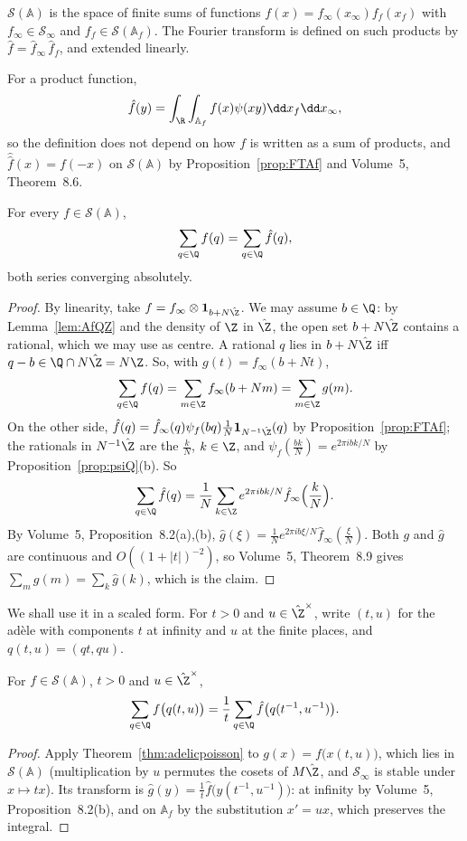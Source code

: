 \begin{definition}
$\mathcal S(\mathbb{A})$ is the space of finite sums of functions $f(x)=f_\infty(x_\infty)f_f(x_f)$ with $f_\infty\in\mathcal S_\infty$ and
$f_f\in\mathcal S(\mathbb{A}_f)$. The Fourier transform is defined on such products by $\hat f=\hat f_\infty\,\hat f_f$, and extended linearly.
\end{definition}

For a product function,
\[
\hat f(y)=\int_\R\int_{\mathbb{A}_f}f(x)\psi(xy)\dd x_f\dd x_\infty,
\]
so the definition does not depend on how $f$ is written as a
sum of products, and $\hat{\hat f}(x)=f(-x)$ on $\mathcal S(\mathbb{A})$ by Proposition~\ref{prop:FTAf} and Volume~5, Theorem~8.6.

\begin{theorem}\label{thm:adelicpoisson}
For every $f\in\mathcal S(\mathbb{A})$,
\[
\sum_{q\in\Q}f(q)=\sum_{q\in\Q}\hat f(q),
\]
both series converging absolutely.
\end{theorem}
\begin{proof}
By linearity, take $f=f_\infty\otimes\mathbf 1_{b+N\hat{\Z}}$. We may assume $b\in\Q$: by Lemma~\ref{lem:AfQZ} and the density of $\Z$ in
$\hat{\Z}$, the open set $b+N\hat{\Z}$ contains a rational, which we may use as centre. A rational $q$ lies in $b+N\hat{\Z}$ iff
$q-b\in\Q\cap N\hat{\Z}=N\Z$. So, with $g(t)=f_\infty(b+Nt)$,
\[
\sum_{q\in\Q}f(q)=\sum_{m\in\Z}f_\infty(b+Nm)=\sum_{m\in\Z}g(m).
\]
On the other side, $\hat f(q)=\hat f_\infty(q)\psi_f(bq)\frac1N\mathbf 1_{N^{-1}\hat{\Z}}(q)$ by Proposition~\ref{prop:FTAf}; the rationals in
$N^{-1}\hat{\Z}$ are the $\frac kN$, $k\in\Z$, and $\psi_f(\frac{bk}N)=e^{2\pi ibk/N}$ by Proposition~\ref{prop:psiQ}(b). So
\[
\sum_{q\in\Q}\hat f(q)=\frac1N\sum_{k\in\Z}e^{2\pi ibk/N}\hat f_\infty\Bigl(\frac kN\Bigr).
\]
By Volume~5, Proposition~8.2(a),(b), $\hat g(\xi)=\frac1Ne^{2\pi ib\xi/N}\hat f_\infty(\frac\xi N)$. Both $g$ and $\hat g$ are continuous
and $O((1+|t|)^{-2})$, so Volume~5, Theorem~8.9 gives $\sum_mg(m)=\sum_k\hat g(k)$, which is the claim.
\end{proof}

We shall use it in a scaled form. For $t>0$ and $u\in\hat{\Z}^\times$, write $(t,u)$ for the ad\`ele with components $t$ at infinity and
$u$ at the finite places, and $q(t,u)=(qt,qu)$.

\begin{corollary}\label{cor:scaledpoisson}
For $f\in\mathcal S(\mathbb{A})$, $t>0$ and $u\in\hat{\Z}^\times$,
\[
\sum_{q\in\Q}f\bigl(q(t,u)\bigr)=\frac1t\sum_{q\in\Q}\hat f\bigl(q(t^{-1},u^{-1})\bigr).
\]
\end{corollary}
\begin{proof}
Apply Theorem~\ref{thm:adelicpoisson} to $g(x)=f\bigl(x(t,u)\bigr)$, which lies in $\mathcal S(\mathbb{A})$ (multiplication by $u$ permutes the
cosets of $M\hat{\Z}$, and $\mathcal S_\infty$ is stable under $x\mapsto tx$). Its transform is $\hat g(y)=\frac1t\hat f\bigl(y(t^{-1},u^{-1})\bigr)$:
at infinity by Volume~5, Proposition~8.2(b), and on $\mathbb{A}_f$ by the substitution $x'=ux$, which preserves the integral.
\end{proof}

